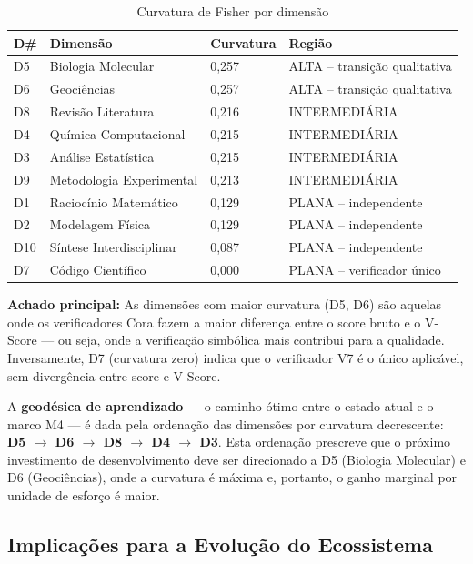 \begin{table}[H]\centering
\caption{Curvatura de Fisher por dimensão}
\label{tab:curvature}
\begin{tabular}{p{}p{}p{}p{}}
\toprule
\textbf{D\#} & \textbf{Dimensão} & \textbf{Curvatura} & \textbf{Região} \\
\midrule
D5  & Biologia Molecular      & 0,257 & ALTA -- transição qualitativa \\
D6  & Geociências             & 0,257 & ALTA -- transição qualitativa \\
D8  & Revisão Literatura      & 0,216 & INTERMEDIÁRIA \\
D4  & Química Computacional   & 0,215 & INTERMEDIÁRIA \\
D3  & Análise Estatística     & 0,215 & INTERMEDIÁRIA \\
D9  & Metodologia Experimental & 0,213 & INTERMEDIÁRIA \\
D1  & Raciocínio Matemático   & 0,129 & PLANA -- independente \\
D2  & Modelagem Física        & 0,129 & PLANA -- independente \\
D10 & Síntese Interdisciplinar & 0,087 & PLANA -- independente \\
D7  & Código Científico       & 0,000 & PLANA -- verificador único \\
\bottomrule
\end{tabular}
\end{table}

\textbf{Achado principal:} As dimensões com maior curvatura (D5, D6) são
aquelas onde os verificadores Cora fazem a maior diferença entre o score bruto
e o V-Score — ou seja, onde a verificação simbólica mais contribui para a
qualidade. Inversamente, D7 (curvatura zero) indica que o verificador V7 é o
único aplicável, sem divergência entre score e V-Score.

A \textbf{geodésica de aprendizado} — o caminho ótimo entre o estado atual
e o marco M4 — é dada pela ordenação das dimensões por curvatura decrescente:
\textbf{D5 $\to$ D6 $\to$ D8 $\to$ D4 $\to$ D3}. Esta ordenação prescreve
que o próximo investimento de desenvolvimento deve ser direcionado a D5
(Biologia Molecular) e D6 (Geociências), onde a curvatura é máxima e,
portanto, o ganho marginal por unidade de esforço é maior.

\subsection{Implicações para a Evolução do Ecossistema}

